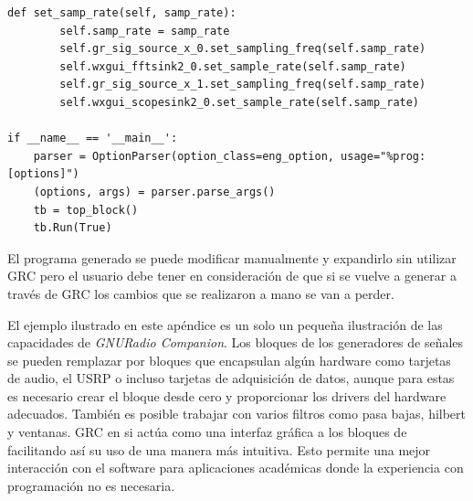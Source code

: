 \begin{lstlisting}[float=hp, label=ex:grcpython, caption={C\'odigo Python generado por GRC}, breaklines=true]
	def set_samp_rate(self, samp_rate):
		self.samp_rate = samp_rate
		self.gr_sig_source_x_0.set_sampling_freq(self.samp_rate)
		self.wxgui_fftsink2_0.set_sample_rate(self.samp_rate)
		self.gr_sig_source_x_1.set_sampling_freq(self.samp_rate)
		self.wxgui_scopesink2_0.set_sample_rate(self.samp_rate)

if __name__ == '__main__':
	parser = OptionParser(option_class=eng_option, usage="%prog: [options]")
	(options, args) = parser.parse_args()
	tb = top_block()
	tb.Run(True)
\end{lstlisting}

El programa generado se puede modificar manualmente y expandirlo sin utilizar GRC pero el usuario debe tener en consideraci\'on de
que si se vuelve a generar a trav\'es de GRC los cambios que se realizaron a mano se van a perder.

El ejemplo ilustrado en este ap\'endice es un solo un peque\~na ilustraci\'on de las capacidades de
\emph{GNURadio Companion}. Los bloques de los generadores de se\~nales se pueden remplazar por
bloques que encapsulan alg\'un hardware como tarjetas de audio, el USRP o incluso tarjetas de
adquisici\'on de datos, aunque para estas es necesario crear el bloque desde cero y proporcionar los
drivers del hardware adecuados. Tambi\'en es posible trabajar con varios filtros como pasa bajas,
hilbert y ventanas. GRC en si act\'ua como una interfaz gr\'afica a los bloques de \gnuradio
facilitando as\'i su uso de una manera m\'as intuitiva. Esto permite una mejor interacci\'on con el
software para aplicaciones acad\'emicas donde la experiencia con programaci\'on no es necesaria.
